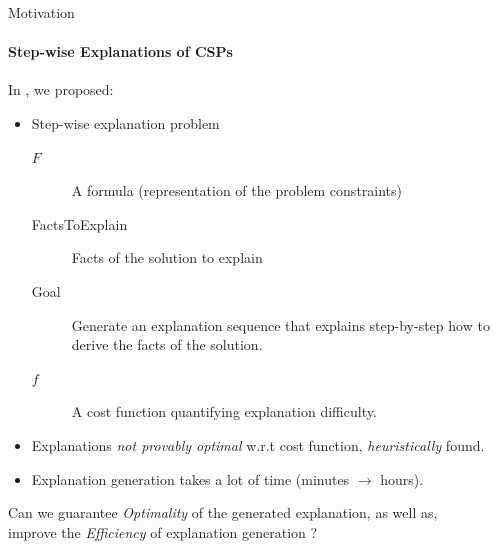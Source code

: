 \documentclass[handout]{beamer}
\newcommand\m[1]{\ensuremath{#1}\xspace}
\newcommand\LitsToExplain{FactsToExplain}
\newcommand\theory{\ensuremath{\m{F} }\xspace}
\begin{document}
	
	\begin{frame}{Motivation}
		\framesubtitle{Step-wise Explanations of CSPs}
%		
%
	In \cite{bogaerts2020step}, we proposed:\pause

\begin{itemize}
	\item[$\checkmark$] Step-wise explanation problem \pause
	\begin{description}
		\item[\theory] A formula (representation of the problem constraints) \pause
		\item[\LitsToExplain] Facts of the solution to explain \pause
		\item[Goal] Generate an explanation sequence that explains step-by-step how to derive the facts of the solution.\pause
		\item[$f$] A cost function quantifying explanation difficulty.
	\end{description}


	\item[x] Explanations \emph{not provably optimal} w.r.t cost function, \emph{heuristically} found.\pause
	\item[x] Explanation generation takes a lot of time (minutes $\rightarrow $ hours).
\end{itemize}

\begin{center}
	Can we guarantee \emph{\color{vuborange}Optimality} of the generated explanation, as well as,\\ improve the \emph{\color{vuborange}Efficiency} of explanation generation ?
\end{center}



	\end{frame}
\end{document}
